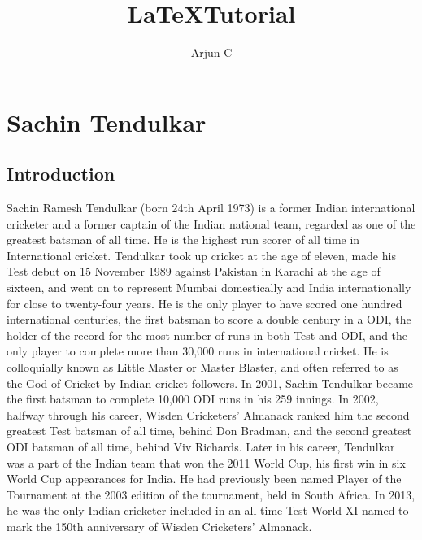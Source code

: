 \documentclass{report}
\begin{document}
	\title{\LaTeX Tutorial}
	\author{Arjun C}
	\maketitle
	\tableofcontents
	\listoffigures
	\chapter{Sachin Tendulkar}
	\section{Introduction}
Sachin Ramesh Tendulkar (born 24th April 1973) is a former Indian international cricketer and a former captain of the Indian national team, regarded as one of the greatest batsman of all time. He is the highest run scorer of all time in International cricket. Tendulkar took up cricket at the age of eleven, made his Test debut on 15 November 1989 against Pakistan in Karachi at the age of sixteen, and went on to represent Mumbai domestically and India internationally for close to twenty-four years. He is the only player to have scored one hundred international centuries, the first batsman to score a double century in a ODI, the holder of the record for the most number of runs in both Test and ODI, and the only player to complete more than 30,000 runs in international cricket. He is colloquially known as Little Master or Master Blaster, and often referred to as the God of Cricket by Indian cricket followers. In 2001, Sachin Tendulkar became the first batsman to complete 10,000 ODI runs in his 259 innings. In 2002, halfway through his career, Wisden Cricketers' Almanack ranked him the second greatest Test batsman of all time, behind Don Bradman, and the second greatest ODI batsman of all time, behind Viv Richards. Later in his career, Tendulkar was a part of the Indian team that won the 2011 World Cup, his first win in six World Cup appearances for India. He had previously been named Player of the Tournament at the 2003 edition of the tournament, held in South Africa. In 2013, he was the only Indian cricketer included in an all-time Test World XI named to mark the 150th anniversary of Wisden Cricketers' Almanack. 
\end{document}
